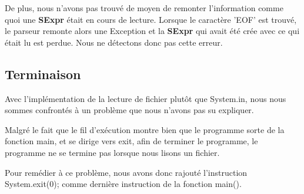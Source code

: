 \documentclass[a4paper, 11pt]{article}
\numberwithin{equation}{section}
\theoremstyle{definition}
\begin{document}
De plus, nous n'avons pas trouvé de moyen de remonter l'information comme quoi une {\bfseries SExpr} était en cours de lecture. Lorsque le caractère 'EOF' est trouvé, le parseur remonte alors une Exception et la {\bfseries SExpr} qui avait été crée avec ce qui était lu est perdue. Nous ne détectons donc pas cette erreur.

\subsection{Terminaison}

Avec l'implémentation de la lecture de fichier plutôt que System.in, nous nous sommes confrontés à un problème que nous n'avons pas su expliquer.

Malgré le fait que le fil d'exécution montre bien que le programme sorte de la fonction main, et se dirige vers exit, afin de terminer le programme, le programme ne se termine pas lorsque nous lisons un fichier.

Pour remédier à ce problème, nous avons donc rajouté l'instruction System.exit(0); comme dernière instruction de la fonction main().
\end{document}
